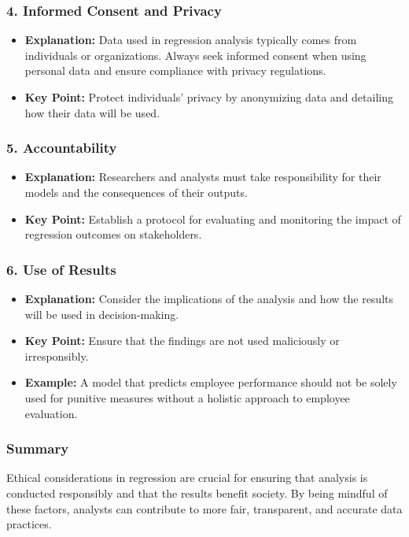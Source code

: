\documentclass[aspectratio=169]{beamer}
\begin{document}
\begin{frame}[fragile]
    \frametitle{4. Informed Consent and Privacy}
    \begin{itemize}
        \item \textbf{Explanation:} Data used in regression analysis typically comes from individuals or organizations. Always seek informed consent when using personal data and ensure compliance with privacy regulations.
        \item \textbf{Key Point:} Protect individuals' privacy by anonymizing data and detailing how their data will be used.
    \end{itemize}
\end{frame}

\begin{frame}[fragile]
    \frametitle{5. Accountability}
    \begin{itemize}
        \item \textbf{Explanation:} Researchers and analysts must take responsibility for their models and the consequences of their outputs.
        \item \textbf{Key Point:} Establish a protocol for evaluating and monitoring the impact of regression outcomes on stakeholders.
    \end{itemize}
\end{frame}

\begin{frame}[fragile]
    \frametitle{6. Use of Results}
    \begin{itemize}
        \item \textbf{Explanation:} Consider the implications of the analysis and how the results will be used in decision-making.
        \item \textbf{Key Point:} Ensure that the findings are not used maliciously or irresponsibly.
        \item \textbf{Example:} A model that predicts employee performance should not be solely used for punitive measures without a holistic approach to employee evaluation.
    \end{itemize}
\end{frame}

\begin{frame}[fragile]
    \frametitle{Summary}
    Ethical considerations in regression are crucial for ensuring that analysis is conducted responsibly and that the results benefit society. By being mindful of these factors, analysts can contribute to more fair, transparent, and accurate data practices.
\end{frame}
\end{document}
